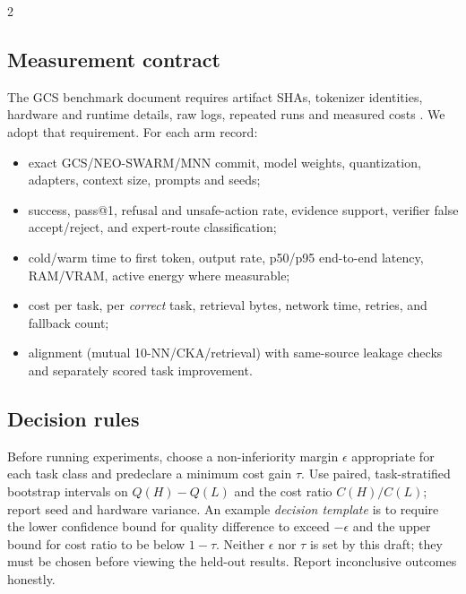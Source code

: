 \documentclass[10pt,letterpaper]{article}
\begin{document}
\begin{multicols}{2}
\subsection{Measurement contract}
The GCS benchmark document requires artifact SHAs, tokenizer identities, hardware and runtime details, raw logs, repeated runs and measured costs \cite{gcsbench}. We adopt that requirement. For each arm record:
\begin{itemize}
\item exact GCS/NEO-SWARM/MNN commit, model weights, quantization, adapters, context size, prompts and seeds;
\item success, pass@1, refusal and unsafe-action rate, evidence support, verifier false accept/reject, and expert-route classification;
\item cold/warm time to first token, output rate, p50/p95 end-to-end latency, RAM/VRAM, active energy where measurable;
\item cost per task, per \emph{correct} task, retrieval bytes, network time, retries, and fallback count;
\item alignment (mutual 10-NN/CKA/retrieval) with same-source leakage checks and separately scored task improvement.
\end{itemize}

\subsection{Decision rules}
Before running experiments, choose a non-inferiority margin $\epsilon$ appropriate for each task class and predeclare a minimum cost gain $\tau$. Use paired, task-stratified bootstrap intervals on $Q(H)-Q(L)$ and the cost ratio $C(H)/C(L)$; report seed and hardware variance. An example \emph{decision template} is to require the lower confidence bound for quality difference to exceed $-\epsilon$ and the upper bound for cost ratio to be below $1-\tau$. Neither $\epsilon$ nor $\tau$ is set by this draft; they must be chosen before viewing the held-out results. Report inconclusive outcomes honestly.


\end{multicols}
\end{document}
